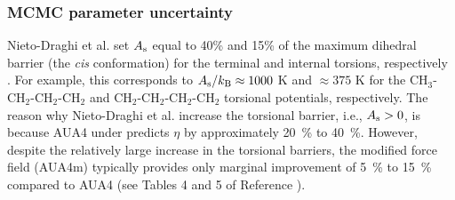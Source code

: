 \documentclass[preprint,review,12pt]{elsarticle}
\begin{document}
%	

    \subsubsection{MCMC parameter uncertainty} \label{sec:parameter_uncertainty}

	Nieto-Draghi et al. set $A_{\rm s}$ equal to 40\% and 15\% of the maximum dihedral barrier (the \textit{cis} conformation) for the terminal and internal torsions, respectively \cite{Nieto2006,Nieto2008}. For example, this corresponds to $A_{\rm s}/k_{\rm B} \approx 1000$ K and $\approx 375$ K for the CH$_3$-CH$_2$-CH$_2$-CH$_2$ and CH$_2$-CH$_2$-CH$_2$-CH$_2$ torsional potentials, respectively. The reason why Nieto-Draghi et al. increase the torsional barrier, i.e., $A_{\rm s} > 0$, is because AUA4 under predicts $\eta$ by approximately 20~\% to 40~\%. However, despite the relatively large increase in the torsional barriers, the modified force field (AUA4m) typically provides only marginal improvement of 5~\% to 15~\% compared to AUA4 (see Tables 4 and 5 of Reference ). 
	
	
	
\end{document}
